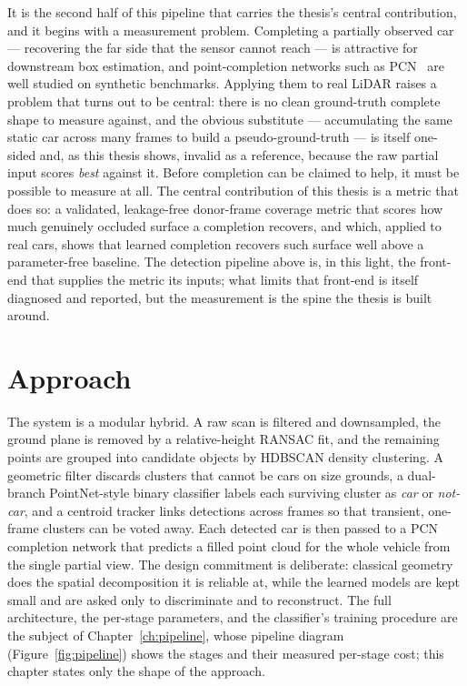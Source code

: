 It is the second half of this pipeline that carries the thesis's central
contribution, and it begins with a measurement problem. Completing a partially
observed car --- recovering the far side that the sensor cannot reach --- is
attractive for downstream box estimation, and point-completion networks such as
PCN~\cite{yuan2019pcnpointcompletionnetwork} are well studied on synthetic
benchmarks. Applying them to real LiDAR raises a problem that turns out to be
central: there is no clean ground-truth complete shape to measure against, and the
obvious substitute --- accumulating the same static car across many frames to build
a pseudo-ground-truth --- is itself one-sided and, as this thesis shows, invalid as
a reference, because the raw partial input scores \emph{best} against it. Before
completion can be claimed to help, it must be possible to measure at all. The
central contribution of this thesis is a metric that does so: a validated,
leakage-free donor-frame coverage metric that scores how much genuinely occluded
surface a completion recovers, and which, applied to real cars, shows that learned
completion recovers such surface well above a parameter-free baseline. The detection
pipeline above is, in this light, the front-end that supplies the metric its inputs;
what limits that front-end is itself diagnosed and reported, but the measurement is
the spine the thesis is built around.

\section{Approach}
\label{sec:intro-approach}

The system is a modular hybrid. A raw scan is filtered and downsampled, the ground
plane is removed by a relative-height RANSAC fit, and the remaining points are
grouped into candidate objects by HDBSCAN density clustering. A geometric filter
discards clusters that cannot be cars on size grounds, a dual-branch PointNet-style
binary classifier labels each surviving cluster as \emph{car} or \emph{not-car}, and
a centroid tracker links detections across frames so that transient, one-frame
clusters can be voted away. Each detected car is then passed to a PCN completion
network that predicts a filled point cloud for the whole vehicle from the single
partial view. The design commitment is deliberate: classical geometry does the
spatial decomposition it is reliable at, while the learned models are kept small and
are asked only to discriminate and to reconstruct. The full architecture, the
per-stage parameters, and the classifier's training procedure are the subject of
Chapter~\ref{ch:pipeline}, whose pipeline diagram (Figure~\ref{fig:pipeline}) shows the stages and their measured
per-stage cost; this chapter states only the shape of the approach.


